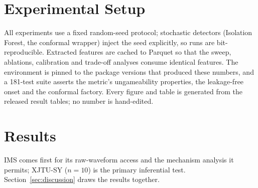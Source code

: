 \documentclass[IJPHM, 2026, 0]{PHMSociety}
\begin{document}
\section{Experimental Setup}
All experiments use a fixed random-seed protocol; stochastic detectors (Isolation Forest, the conformal wrapper) inject the seed explicitly, so runs are bit-reproducible. Extracted features are cached to Parquet so that the sweep, ablations, calibration and trade-off analyses consume identical features. The environment is pinned to the package versions that produced these numbers, and a 181-test suite asserts the metric's ungameability properties, the leakage-free onset and the conformal factory. Every figure and table is generated from the released result tables; no number is hand-edited.

\section{Results}
\label{sec:results}
IMS comes first for its raw-waveform access and the mechanism analysis it permits; XJTU-SY ($n=10$) is the primary inferential test. Section~\ref{sec:discussion} draws the results together.
\end{document}
